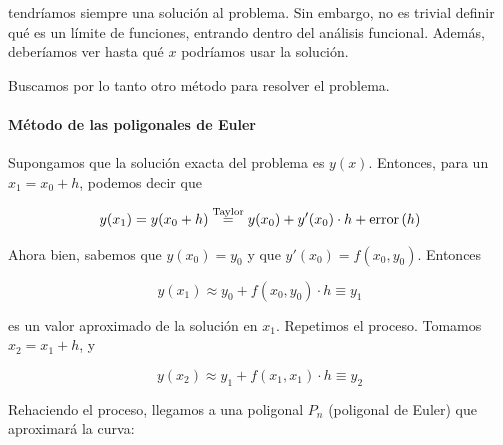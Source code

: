 tendríamos siempre una solución al problema. Sin embargo, no es trivial definir qué es un límite de funciones, entrando dentro del análisis funcional. Además, deberíamos ver hasta qué $x$ podríamos usar la solución. 

Buscamos por lo tanto otro método para resolver el problema.

\paragraph{Método de las poligonales de Euler} Supongamos que la solución exacta del problema es $y(x)$. Entonces, para un $x_1=x_0 + h$, podemos decir que

\[ y(x_1) = y(x_0 + h) \stackrel{\text{Taylor}}{=} y(x_0) + y'(x_0)\cdot h + \mop{error}(h) \]

Ahora bien, sabemos que $y(x_0) = y_0$ y que $y'(x_0) =f(x_0, y_0)$. Entonces

\[ y(x_1) ≈ y_0 + f(x_0, y_0)·h \equiv y_1 \]

es un valor aproximado de la solución en $x_1$. Repetimos el proceso. Tomamos $x_2 = x_1 + h$, y 

\[ y(x_2) ≈ y_1 + f(x_1,x_1)· h \equiv y_2 \]

Rehaciendo el proceso, llegamos a una poligonal $P_n$ (poligonal de Euler) que aproximará la curva:

\begin{figure}[hbtp]
\centering
{}
\end{figure}


